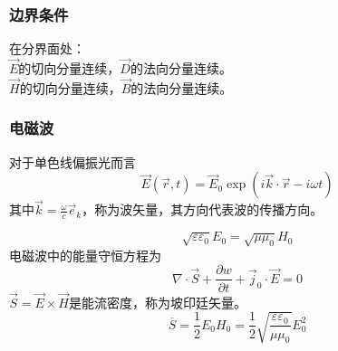 \documentclass[12pt, a4paper, oneside]{ctexart}
\begin{document}
\subsubsection{边界条件}
在分界面处：\\
$\vec{E}$的切向分量连续，$\vec{D}$的法向分量连续。\\
$\vec{H}$的切向分量连续，$\vec{B}$的法向分量连续。
\subsubsection{电磁波}
对于单色线偏振光而言
$$\vec{E}(\vec{r},t)=\vec{E}_0\exp(i\vec{k}\cdot\vec{r}-i\omega t)$$
其中$\vec{k}=\frac{\omega}{c}\vec{e}_k$，称为波矢量，其方向代表波的传播方向。

$$\sqrt{\varepsilon\varepsilon_0}E_0=\sqrt{\mu\mu_0}H_0$$
电磁波中的能量守恒方程为
$$\nabla\cdot\vec{S}+\frac{\partial w}{\partial t}+\vec{j}_0\cdot\vec{E}=0$$
$\vec{S}=\vec{E}\times\vec{H}$是能流密度，称为坡印廷矢量。
$$\overline{S}=\frac{1}{2}E_0H_0=\frac{1}{2}\sqrt{\frac{\varepsilon\varepsilon_0}{\mu\mu_0}}E_0^2$$
%
%
\end{document}
